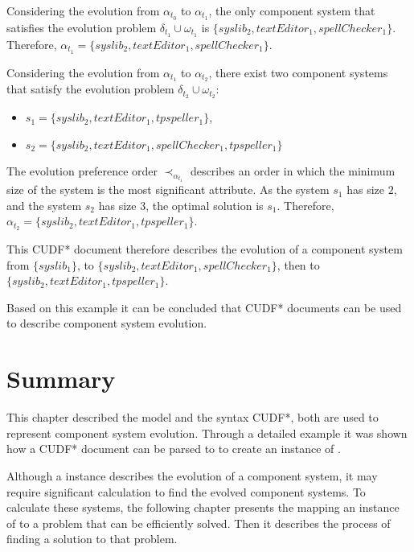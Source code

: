 Considering the evolution from $\alpha_{t_0}$ to $\alpha_{t_1}$,
the only component system that satisfies the evolution problem $\delta_{t_1} \cup \omega_{t_1}$
is $\{syslib_2, textEditor_1, spellChecker_1\}$.
Therefore, $\alpha_{t_1} = \{syslib_2, textEditor_1, spellChecker_1\}$.

Considering the evolution from $\alpha_{t_1}$ to $\alpha_{t_2}$,
there exist two component systems that satisfy the evolution problem $\delta_{t_2} \cup \omega_{t_2}$:
\begin{itemize}
  \item $s_1 = \{syslib_2, textEditor_1, tpspeller_1\}$,
  \item $s_2 = \{syslib_2, textEditor_1, spellChecker_1, tpspeller_1\}$
\end{itemize}

The evolution preference order $\prec_{\alpha_{t_1}}$ describes an order in which the minimum size of the system is the most significant attribute.
As the system $s_1$ has size $2$, and the system $s_2$ has size $3$, the optimal solution is $s_1$.
Therefore, $\alpha_{t_2} = \{syslib_2, textEditor_1, tpspeller_1\}$.

This CUDF* document therefore describes the evolution of a component system from 
$\{syslib_1\}$, to $\{syslib_2, textEditor_1, spellChecker_1\}$, then to $\{syslib_2, textEditor_1, tpspeller_1\}$.

Based on this example it can be concluded that CUDF* documents can be used to describe component system evolution. 

\section{Summary}
This chapter described the model \modelname and the syntax CUDF*, both are used to represent component system evolution.
Through a detailed example it was shown how a CUDF* document can be parsed to to create an instance of \modelname.

Although a \modelname instance describes the evolution of a component system, it may require significant calculation to find the evolved component systems.
To calculate these systems, the following chapter presents the mapping an instance of \modelname to a problem that can be efficiently solved.
Then it describes the process of finding a solution to that problem.
